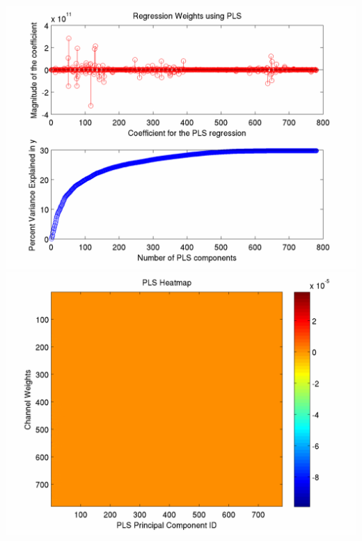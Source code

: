 \documentclass[12pt]{article}
\begin{document}
\includegraphics[scale=0.2]{full_pls_regression_weights_pctvar.png}
\includegraphics[scale=0.2]{full_PLS_heatmap.png}
\end{document}
